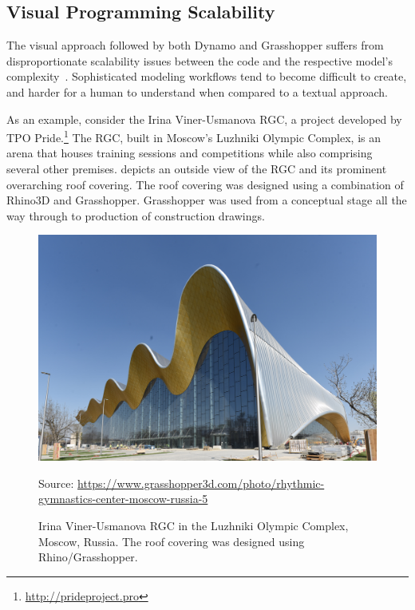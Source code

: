 \subsection{Visual Programming Scalability}%
\label{sec:related.ad.vpl-scalability}

The visual approach followed by both Dynamo and Grasshopper suffers from
disproportionate scalability issues between the code and the respective model's
complexity~\cite{Leitao:2013:PESLGD}.  Sophisticated modeling workflows tend to
become difficult to create, and harder for a human to understand when compared
to a textual approach.

As an example, consider the Irina Viner-Usmanova \ac{RGC}, a project developed
by TPO Pride.\footnote{\url{http://prideproject.pro}}  The \ac{RGC}, built in
Moscow's Luzhniki Olympic Complex, is an arena that houses training sessions and
competitions while also comprising several other premises.
 depicts an outside view of the
\ac{RGC} and its prominent overarching roof covering.  The roof covering was
designed using a combination of Rhino3D and Grasshopper.  Grasshopper was used
from a conceptual stage all the way through to production of construction
drawings.

\begin{figure}[htb]
  \includegraphics[width=\linewidth]{fig/rgc}
  \begin{minipage}{\linewidth}
  \scriptsize Source:
  \url{https://www.grasshopper3d.com/photo/rhythmic-gymnastics-center-moscow-russia-5}
  \end{minipage}
  \caption[\Acl{RGC} in the Luzhniki Complex]{
    Irina Viner-Usmanova \ac{RGC} in the Luzhniki Olympic Complex, Moscow,
    Russia.  The roof covering was designed using Rhino/Grasshopper.}%
  \label{fig:related.ad.vpl-scalability.rgc}
\end{figure}

